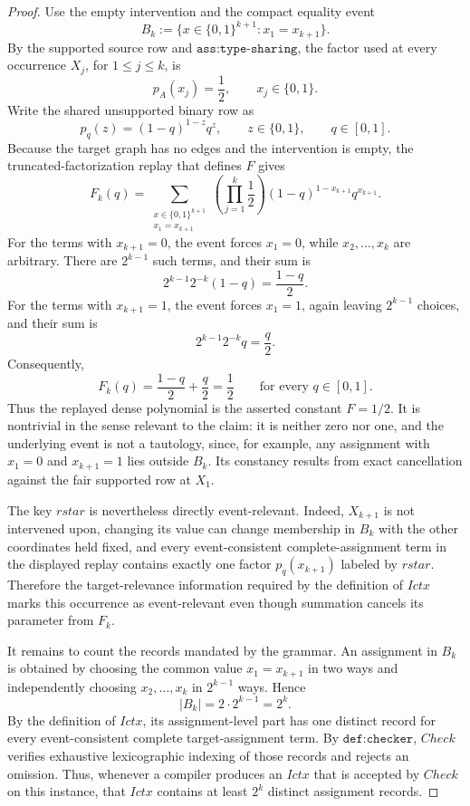 \documentclass{article}
\begin{document}
\begin{proof}
Use the empty intervention and the compact equality event
\[
B_k:=\bigl\{x\in\{0,1\}^{k+1}:x_1=x_{k+1}\bigr\}.
\]
By the supported source row and \(\texttt{ass:type-sharing}\), the factor used at every occurrence \(X_j\), for \(1\leq j\leq k\), is
\[
p_A(x_j)=\frac12,
\qquad x_j\in\{0,1\}.
\]
Write the shared unsupported binary row as
\[
p_q(z)=(1-q)^{1-z}q^z,
\qquad z\in\{0,1\},\qquad q\in[0,1].
\]
Because the target graph has no edges and the intervention is empty, the truncated-factorization replay that defines \(F\) gives
\[
F_k(q)
=\sum_{\substack{x\in\{0,1\}^{k+1}\\x_1=x_{k+1}}}
  \left(\prod_{j=1}^{k}\frac12\right)
  (1-q)^{1-x_{k+1}}q^{x_{k+1}}.
\]
For the terms with \(x_{k+1}=0\), the event forces \(x_1=0\), while \(x_2,\ldots,x_k\) are arbitrary.  There are \(2^{k-1}\) such terms, and their sum is
\[
2^{k-1}2^{-k}(1-q)=\frac{1-q}{2}.
\]
For the terms with \(x_{k+1}=1\), the event forces \(x_1=1\), again leaving \(2^{k-1}\) choices, and their sum is
\[
2^{k-1}2^{-k}q=\frac q2.
\]
Consequently,
\[
F_k(q)=\frac{1-q}{2}+\frac q2=\frac12
\qquad\text{for every }q\in[0,1].
\]
Thus the replayed dense polynomial is the asserted constant \(F=1/2\).  It is nontrivial in the sense relevant to the claim: it is neither zero nor one, and the underlying event is not a tautology, since, for example, any assignment with \(x_1=0\) and \(x_{k+1}=1\) lies outside \(B_k\).  Its constancy results from exact cancellation against the fair supported row at \(X_1\).

The key \(rstar\) is nevertheless directly event-relevant.  Indeed, \(X_{k+1}\) is not intervened upon, changing its value can change membership in \(B_k\) with the other coordinates held fixed, and every event-consistent complete-assignment term in the displayed replay contains exactly one factor \(p_q(x_{k+1})\) labeled by \(rstar\).  Therefore the target-relevance information required by the definition of \(Ictx\) marks this occurrence as event-relevant even though summation cancels its parameter from \(F_k\).

It remains to count the records mandated by the grammar.  An assignment in \(B_k\) is obtained by choosing the common value \(x_1=x_{k+1}\) in two ways and independently choosing \(x_2,\ldots,x_k\) in \(2^{k-1}\) ways.  Hence
\[
|B_k|=2\cdot 2^{k-1}=2^k.
\]
By the definition of \(Ictx\), its assignment-level part has one distinct record for every event-consistent complete target-assignment term.  By \(\texttt{def:checker}\), \(Check\) verifies exhaustive lexicographic indexing of those records and rejects an omission.  Thus, whenever a compiler produces an \(Ictx\) that is accepted by \(Check\) on this instance, that \(Ictx\) contains at least \(2^k\) distinct assignment records.


\end{proof}
\end{document}
